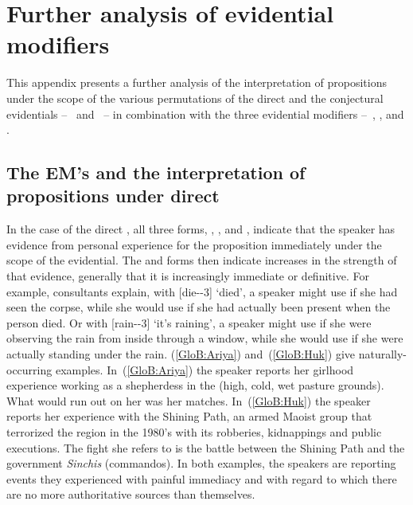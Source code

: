 \chapter{Further analysis of evidential modifiers}

This appendix presents a further analysis of the interpretation of propositions under the scope of the various permutations of the direct and the conjectural evidentials --~ and ~-- in combination with the three evidential modifiers --~\phono{-\uo}, , and .

\section{The EM’s and the interpretation of propositions under direct }
In the case of the direct , all three forms, , , and , indicate that the speaker has evidence from personal experience for the proposition immediately under the scope of the evidential. The  and  forms then indicate increases in the strength of that evidence, generally that it is increasingly immediate or definitive. For example, consultants explain, with  [die--3] ‘died’, a speaker might use  if she had seen the corpse, while she would use  if she had actually been present when the person died. Or with  [rain--3] ‘it’s raining’, a speaker might use  if she were observing the rain from inside through a window, while she would use  if she were actually standing under the rain. (\ref{GloB:Ariya}) and~(\ref{GloB:Huk}) give naturally-occurring  examples. In~(\ref{GloB:Ariya}) the speaker reports her girlhood experience working as a shepherdess in the  (high, cold, wet pasture grounds). What would run out on her was her matches. In~(\ref{GloB:Huk}) the speaker reports her experience with the Shining Path, an armed Maoist group that terrorized the region in the 1980’s with its robberies, kidnappings and public executions. The fight she refers to is the battle between the Shining Path and the government \emph{Sinchis} (commandos). In both examples, the speakers are reporting events they experienced with painful immediacy and with regard to which there are no more authoritative sources than themselves.\\

